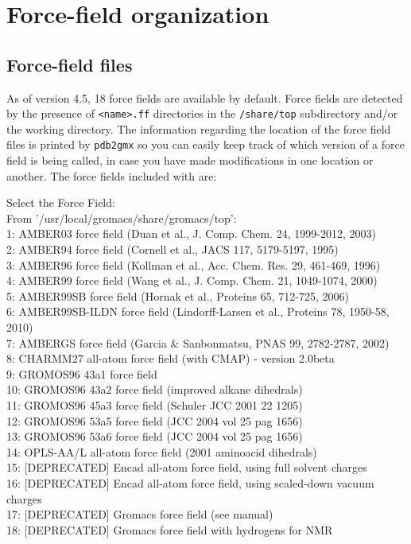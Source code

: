 \section{Force-field organization }
\label{sec:fforganization}

\subsection{Force-field files}
\label{subsec:fffiles}
As of {\gromacs} version 4.5, 18 force fields are available by default.
Force fields are detected by the presence of {\tt <name>.ff} directories
in the {\gromacs} {\tt /share/top} subdirectory and/or the working directory.  
The information regarding the location of the force field files is printed
by {\tt pdb2gmx} so you can easily keep track of which version of a force field
is being called, in case you have made modifications in one location or another.
The force fields included with {\gromacs} are:

{\small \begin{tt}
Select the Force Field: \\
From '/usr/local/gromacs/share/gromacs/top': \\
 1: AMBER03 force field (Duan et al., J. Comp. Chem. 24, 1999-2012, 2003) \\
 2: AMBER94 force field (Cornell et al., JACS 117, 5179-5197, 1995) \\
 3: AMBER96 force field (Kollman et al., Acc. Chem. Res. 29, 461-469, 1996) \\
 4: AMBER99 force field (Wang et al., J. Comp. Chem. 21, 1049-1074, 2000) \\
 5: AMBER99SB force field (Hornak et al., Proteins 65, 712-725, 2006) \\
 6: AMBER99SB-ILDN force field (Lindorff-Larsen et al., Proteins 78, 1950-58, 2010) \\
 7: AMBERGS force field (Garcia $\&$ Sanbonmatsu, PNAS 99, 2782-2787, 2002) \\
 8: CHARMM27 all-atom force field (with CMAP) - version 2.0beta \\
 9: GROMOS96 43a1 force field \\
10: GROMOS96 43a2 force field (improved alkane dihedrals) \\
11: GROMOS96 45a3 force field (Schuler JCC 2001 22 1205) \\
12: GROMOS96 53a5 force field (JCC 2004 vol 25 pag 1656) \\
13: GROMOS96 53a6 force field (JCC 2004 vol 25 pag 1656) \\
14: OPLS-AA/L all-atom force field (2001 aminoacid dihedrals) \\
15: [DEPRECATED] Encad all-atom force field, using full solvent charges \\
16: [DEPRECATED] Encad all-atom force field, using scaled-down vacuum charges \\
17: [DEPRECATED] Gromacs force field (see manual) \\
18: [DEPRECATED] Gromacs force field with hydrogens for NMR \\
\end{tt}}

